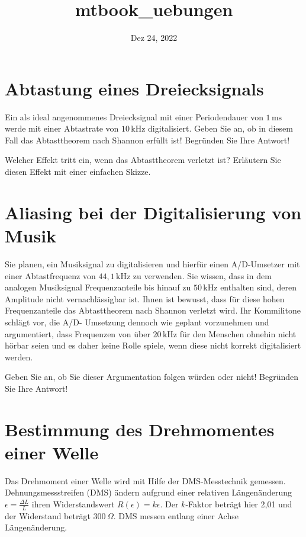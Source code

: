 \documentclass[
]{book}
\title{mtbook\_uebungen}
\author{}
\date{Dez 24, 2022}
\begin{document}
\frontmatter
\maketitle

\mainmatter
\section{Abtastung eines Dreiecksignals}\label{abtastung-eines-dreiecksignals}

Ein als ideal angenommenes Dreiecksignal mit einer Periodendauer von \(1\,\mathrm{ms}\) werde mit einer Abtastrate von \(10\,\mathrm{kHz}\) digitalisiert. Geben Sie an, ob in diesem Fall das Abtasttheorem nach Shannon erfüllt ist! Begründen Sie Ihre Antwort!

Welcher Effekt tritt ein, wenn das Abtasttheorem verletzt ist? Erläutern Sie diesen Effekt mit einer einfachen Skizze.

\section{Aliasing bei der Digitalisierung von Musik}\label{aliasing-bei-der-digitalisierung-von-musik}

Sie planen, ein Musiksignal zu digitalisieren und hierfür einen A/D-Umsetzer mit einer Abtastfrequenz von \(44,1\,\mathrm{kHz}\) zu verwenden. Sie wissen, dass in dem analogen Musiksignal Frequenzanteile bis hinauf zu \(50\,\mathrm{kHz}\) enthalten sind, deren Amplitude nicht vernachlässigbar ist. Ihnen ist bewusst, dass für diese hohen Frequenzanteile das Abtasttheorem nach Shannon verletzt wird. Ihr Kommilitone schlägt vor, die A/D- Umsetzung dennoch wie geplant vorzunehmen und argumentiert, dass Frequenzen von über \(20\,\mathrm{kHz}\) für den Menschen ohnehin nicht hörbar seien und es daher keine Rolle spiele, wenn diese nicht korrekt digitalisiert werden.

Geben Sie an, ob Sie dieser Argumentation folgen würden oder nicht! Begründen Sie Ihre Antwort!

\section{Bestimmung des Drehmomentes einer Welle}\label{bestimmung-des-drehmomentes-einer-welle}

Das Drehmoment einer Welle wird mit Hilfe der DMS-Messtechnik gemessen. Dehnungsmessstreifen (DMS) ändern aufgrund einer relativen Längenänderung \(\epsilon = \frac{\Delta L}{L}\) ihren Widerstandswert \(R(\epsilon) = k\epsilon\). Der \(k\)-Faktor beträgt hier 2,01 und der Widerstand beträgt \(300\,\Omega\). DMS messen entlang einer Achse Längenänderung.
\end{document}
